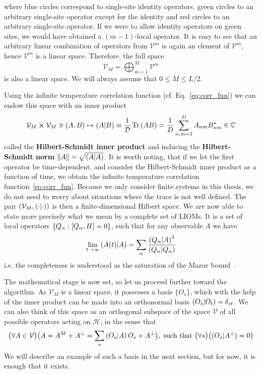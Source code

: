 where blue circles correspond to single-site identity operators, green circles to an arbitrary
single-site operator except for the identity and red circles to an arbitrary single-site operator.
If we were to allow identity operators on green sites, we would have obtained a \((m-1)\)-local operator.
It is easy to see that an arbitrary linear combination of operators from \(\mathcal{V}^m\) is again
an element of \(\mathcal{V}^m\), hence \(\mathcal{V}^m\) is a linear space. Therefore,
the full space
\begin{equation}
    \mathcal{V}_{M} = \bigoplus_{m=1}^{M} \mathcal{V}^m
\end{equation}
is also a linear space. We will always assume that \(0\leq M \leq L/2\).

Using the infinite temperature correlation function (cf. Eq.~\eqref{eq:corr_fun}) we can endow this space with an inner product
\begin{equation}
    \mathcal{V}_M \cross \mathcal{V}_M \ni (A, B) \mapsto \left(A \middle| B\right)
    \equiv \frac{1}{\mathcal{D}}\Tr\left(AB\right) = \frac{1}{D}\sum_{n,m = 1}^{D} A_{nm} B_{nm}^{\ast} \in \mathbb{C}
    \label{eq:hs_prod}
\end{equation}
called the \textbf{Hilbert-Schmidt inner product} and
inducing the \textbf{Hilbert-Schmidt norm} \(\norm{A} = \sqrt{\left(A \middle| A\right)}\). It is worth noting, that
if we let the first operator be time-dependent, and consider the Hilbert-Schmidt inner product
as a function of time, we obtain the infinite temperature correlation function~\eqref{eq:corr_fun}.
Because we only consider finite systems in this thesis, we do not need to worry about
situations where the trace is not well defined. The pair \( (\mathcal{V}_M, \left(\cdot \middle| \cdot\right)) \)
is then a finite-dimensional Hilbert space.
We are now able to state more precisely what we mean by a complete set of LIOMs.
It is a set of local operators \(\{Q_{\alpha} : \comm{Q_{\alpha}}{H} = 0\}\), such that
for any observable \(A\) we have
\begin{equation}
    \lim_{t\to\infty} \left(A(t) \middle| A\right) = \sum_{\alpha} \frac{\left(Q_{\alpha} \middle| A\right)^2}{\left(Q_{\alpha} \middle| Q_{\alpha}\right)}
\end{equation}
i.e. the completeness is understood as the saturation of the Mazur bound~\autocite{Mazur1969}.

The mathematical stage is now set, so let us proceed further toward the algorithm. 
As \(\mathcal{V}_M\) is a linear space, it possesses a basis \(\{O_{s}\}\),
which with the help of the inner product can be made into an orthonormal basis \(\left(O_s \middle| O_{t}\right) = \delta_{st}\).
We can also think of this space as an orthogonal subspace of the space \(\mathcal{V}\) of all possible operators
acting on \(\mathcal{H}\), in the sense that
\begin{equation}
    \big(\forall A \in \mathcal{V} \big) \big( A = A^M + A^{\perp} = \sum_s \left(O_s \middle| A\right) O_s + A^{\perp}\big) ,
    \text{ such that } \big(\forall s\big) \big( ({O_s}|{A^{\perp}}) = 0\big)
    \label{eq:decomposition}
  \end{equation}
We will describe an example of such a basis in the next section, but for now, it is enough that it exists.

